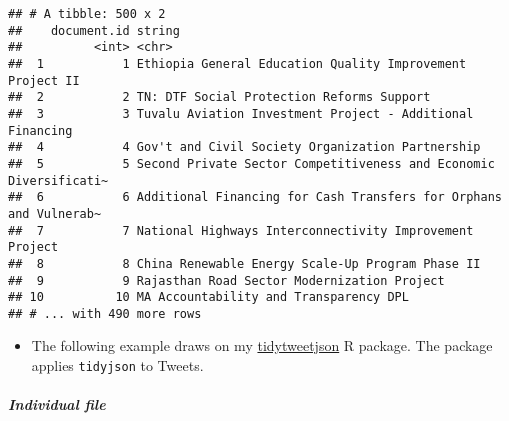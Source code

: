 \documentclass[
]{book}
\providecommand{\tightlist}{%
  \setlength{\itemsep}{0pt}\setlength{\parskip}{0pt}}
\begin{document}
\begin{verbatim}
## # A tibble: 500 x 2
##    document.id string                                                           
##          <int> <chr>                                                            
##  1           1 Ethiopia General Education Quality Improvement Project II        
##  2           2 TN: DTF Social Protection Reforms Support                        
##  3           3 Tuvalu Aviation Investment Project - Additional Financing        
##  4           4 Gov't and Civil Society Organization Partnership                 
##  5           5 Second Private Sector Competitiveness and Economic Diversificati~
##  6           6 Additional Financing for Cash Transfers for Orphans and Vulnerab~
##  7           7 National Highways Interconnectivity Improvement Project          
##  8           8 China Renewable Energy Scale-Up Program Phase II                 
##  9           9 Rajasthan Road Sector Modernization Project                      
## 10          10 MA Accountability and Transparency DPL                           
## # ... with 490 more rows
\end{verbatim}

\begin{itemize}
\tightlist
\item
  The following example draws on my \href{https://github.com/jaeyk/tidytweetjson}{tidytweetjson} R package. The package applies \texttt{tidyjson} to Tweets.
\end{itemize}

\hypertarget{individual-file}{%
\subparagraph{Individual file}\label{individual-file}}
\end{document}
